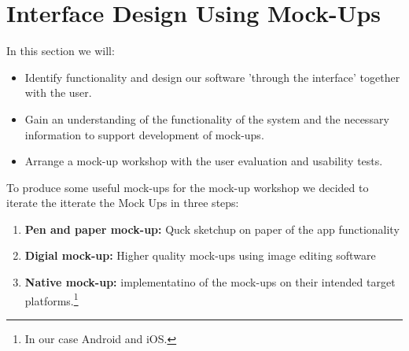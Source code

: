 \section{Interface Design Using Mock-Ups}
In this section we will:

\begin{itemize}
\item Identify functionality and design our software 'through the interface' together with the user.
\item Gain an understanding of the functionality of the system and the necessary information to support development of mock-ups.
\item Arrange a mock-up workshop with the user evaluation and usability tests.
\end{itemize}

To produce some useful mock-ups for the mock-up workshop we decided to iterate the itterate the Mock Ups in three steps:

\begin{enumerate}
    \item \textbf{Pen and paper mock-up:} Quck sketchup on paper of the app functionality
    \item \textbf{Digial mock-up:} Higher quality mock-ups using image editing software
    \item \textbf{Native mock-up:} implementatino of the mock-ups on their intended target platforms.\footnote{In our case Android and iOS.}
\end{enumerate}


